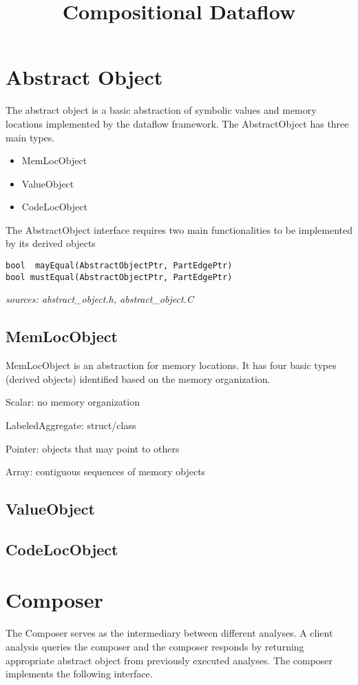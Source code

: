 \documentclass{article}
\begin{document}
\title{Compositional Dataflow}
\date{}
\maketitle
\section*{Abstract Object}
\noindent
The abstract object is a basic abstraction of symbolic values and
memory locations implemented by the dataflow framework. The
AbstractObject has three main types. 
\begin{itemize}
\item MemLocObject 
\item ValueObject 
\item CodeLocObject
\end{itemize}
The AbstractObject interface requires two main functionalities to be
implemented by its derived objects
\begin{lstlisting}
bool  mayEqual(AbstractObjectPtr, PartEdgePtr)
bool mustEqual(AbstractObjectPtr, PartEdgePtr)
\end{lstlisting}
\emph{sources: abstract\_object.h, abstract\_object.C}
\subsection*{MemLocObject}
MemLocObject is an abstraction for memory locations. It has four basic
types (derived objects) identified based on the memory organization.
\begin{description}
\item Scalar: no memory organization
\item LabeledAggregate: struct/class
\item Pointer: objects that may point to others
\item Array: contiguous sequences of memory objects
\end{description}

\subsection*{ValueObject}
\subsection*{CodeLocObject}

\section*{Composer}
The Composer serves as the intermediary between different analyses.  A
client analysis queries the composer and the composer responds by
returning appropriate abstract object from previously executed
analyses. The composer implements the following interface.
\end{document}
